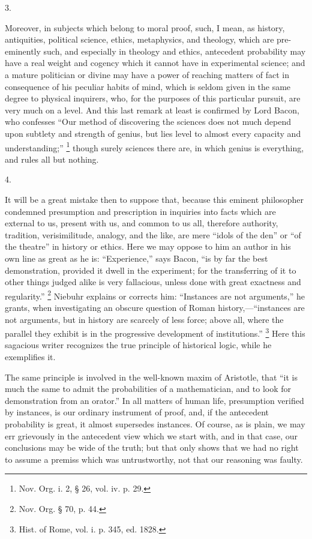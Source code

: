 3.

Moreover, in subjects which belong to moral proof,
such, I mean, as history, antiquities, political science,
ethics, metaphysics, and theology, which are
pre-eminently such, and especially in theology and
ethics, antecedent probability may have a real weight and
cogency which it cannot have in experimental science; and
a mature politician or divine may have a power of
reaching matters of fact in consequence of his peculiar
habits of mind, which is seldom given in the same degree
to physical inquirers, who, for the purposes of this
particular pursuit, are very much on a level. And this
last remark at least is confirmed by Lord Bacon, who
confesses ``Our method of discovering the sciences
does not much depend upon subtlety and strength of
genius, but lies level to almost every capacity and
understanding;'' \footnote{Nov. Org. i. 2, § 26, vol. iv.
p. 29.} though surely sciences there
are, in which genius is everything, and rules all but
nothing.

4.

It will be a great mistake then to suppose that,
because this eminent philosopher condemned presumption
and prescription in inquiries into facts which are
external to us, present with us, and common to us all,
therefore authority, tradition, verisimilitude, analogy,
and the like, are mere ``idols of the den'' or
``of the theatre'' in history or ethics. Here we
may oppose to him an author in his own line as great as
he is: ``Experience,'' says Bacon, ``is by
far the best demonstration, provided it dwell in the
experiment; for the transferring of it to other things
judged alike is very fallacious, unless done with great
exactness and regularity.'' \footnote{Nov. Org. § 70, p. 44.} Niebuhr explains or corrects
him: ``Instances are not arguments,'' he grants,
when investigating an obscure question of Roman
history,—``instances are not arguments, but in
history are scarcely of less force; above all, where the
parallel they exhibit is in the progressive development
of institutions.'' \footnote{Hist. of Rome, vol. i. p. 345,
ed. 1828.} Here this sagacious writer
recognizes the true principle of historical logic, while
he exemplifies it.

The same principle is involved in the well-known maxim
of Aristotle, that ``it is much the same to admit the
probabilities of a mathematician, and to look for
demonstration from an orator.'' In all matters of
human life, presumption verified by instances, is our
ordinary instrument of proof, and, if the antecedent
probability is great, it almost supersedes instances. Of
course, as is plain, we may err grievously in the
antecedent view which we start with, and in that case,
our conclusions may be wide of the truth; but that only
shows that we had no right to assume a premiss which was
untrustworthy, not that our reasoning was faulty.

